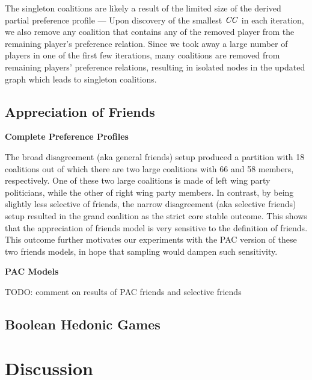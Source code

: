 The singleton coalitions are likely a result of the limited size of the derived partial preference profile --- Upon discovery of the smallest $\mathit{CC}$ in each iteration, we also remove any coalition that contains any of the removed player from the remaining player's preference relation. Since we took away a large number of players in one of the first few iterations, many coalitions are removed from remaining players' preference relations, resulting in isolated nodes in the updated graph which leads to singleton coalitions.

\subsection{Appreciation of Friends}

\textbf{Complete Preference Profiles}


The broad disagreement (aka general friends) setup produced a partition with 18
coalitions out of which there are two large coalitions with 66 and 58 members,
respectively.
One of these two large coalitions is made of left wing party politicians,
while the other of right wing party members.
In contrast, by being slightly less selective of friends, the narrow disagreement
(aka selective friends) setup resulted in the grand coalition as the strict core
stable outcome.
This shows that the appreciation of friends model is very sensitive to the
definition of friends.
This outcome further motivates our experiments with the PAC version of these
two friends models, in hope that sampling would dampen such sensitivity.

\textbf{PAC Models}


TODO: comment on results of PAC friends and selective friends

\subsection{Boolean Hedonic Games}


\section{Discussion}
